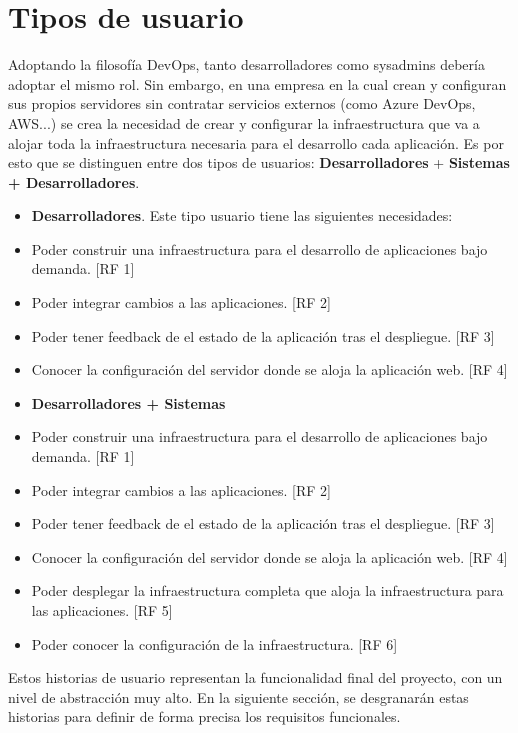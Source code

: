 \section{Tipos de usuario}
	\begin{paragraph}
		Adoptando la filosofía DevOps, tanto desarrolladores como sysadmins debería adoptar el mismo rol. Sin embargo, en una empresa en la cual crean y configuran sus propios servidores sin contratar servicios externos (como Azure DevOps, AWS...) se crea la necesidad de crear y configurar la infraestructura que va a alojar toda la infraestructura necesaria para el desarrollo cada aplicación. Es por esto que se distinguen entre dos tipos de usuarios: \textbf{Desarrolladores} + \textbf{Sistemas + Desarrolladores}.  
		
		\begin{itemize}
			\item \textbf{Desarrolladores}. Este tipo usuario tiene las siguientes necesidades:
				\item Poder construir una infraestructura para el desarrollo de aplicaciones bajo demanda. [RF 1]
				\item Poder integrar cambios a las aplicaciones. [RF 2]
				\item Poder tener feedback de el estado de la aplicación tras el despliegue. [RF 3]
				\item Conocer la configuración del servidor donde se aloja la aplicación web. [RF 4]
			\item \textbf{Desarrolladores + Sistemas}
				\item Poder construir una infraestructura para el desarrollo de aplicaciones bajo demanda. [RF 1]
				\item Poder integrar cambios a las aplicaciones. [RF 2]
				\item Poder tener feedback de el estado de la aplicación tras el despliegue. [RF 3]
				\item Conocer la configuración del servidor donde se aloja la aplicación web. [RF 4]
				\item Poder desplegar la infraestructura completa que aloja la infraestructura para las aplicaciones. [RF 5]
				\item Poder conocer la configuración de la infraestructura. [RF 6]
		\end{itemize}
	
		Estos historias de usuario representan la funcionalidad final del proyecto, con un nivel de abstracción muy alto. En la siguiente sección, se desgranarán estas historias para definir de forma precisa los requisitos funcionales. \cite{ReqF:online} 
	\end{paragraph}

